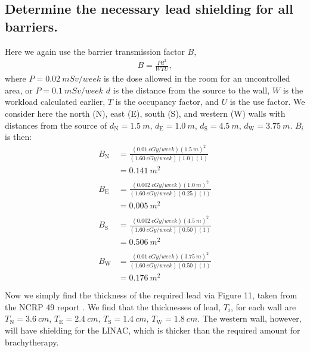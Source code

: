 \documentclass[%
aps,
mph,%
amsmath,amssymb,
preprint,%
tightenlines,
longbibliography,
superscriptaddress,
floatfix,
nofootinbib,
]{revtex4-2}
\begin{document}
    \subsection{Determine the necessary lead shielding for all barriers.}
    Here we again use the barrier transmission factor $B$,
    \begin{align}
        B = \frac{Pd^2}{WTU},
    \end{align}
    where $P = \qty{0.02}{mSv/week}$ is the dose allowed in the room for an uncontrolled area, or $P = \qty{0.1}{mSv/week}$ $d$ is the distance from the source to the wall, $W$ is the workload calculated earlier, $T$ is the occupancy factor, and $U$ is the use factor. We consider here the north (N), east (E), south (S), and western (W) walls with distances from the source of $d_\mathrm{N} = \qty{1.5}{m}$, $d_\mathrm{E} = \qty{1.0}{m}$, $d_\mathrm{S} = \qty{4.5}{m}$, $d_\mathrm{W} = \qty{3.75}{m}$. $B_i$ is then:
    \begin{align*}
        B_{\mathrm{N}} &= \frac{\left(\qty{0.01}{cGy/week}\right)\left(\qty{1.5}{m}\right)^2}{\left(\qty{1.60}{cGy/week}\right)\left(1.0\right)\left( 1 \right)}\\
        &= \qty{0.141}{m^2} \\ \\
        B_{\mathrm{E}} &= \frac{\left(\qty{0.002}{cGy/week}\right)\left(\qty{1.0}{m}\right)^2}{\left(\qty{1.60}{cGy/week}\right)\left(0.25\right)\left( 1 \right)}\\
        &= \qty{0.005}{m^2} \\ \\ 
        B_{\mathrm{S}} &= \frac{\left(\qty{0.002}{cGy/week}\right)\left(\qty{4.5}{m}\right)^2}{\left(\qty{1.60}{cGy/week}\right)\left(0.50\right)\left( 1 \right)}\\
        &= \qty{0.506}{m^2} \\ \\ 
        B_{\mathrm{W}} &= \frac{\left(\qty{0.01}{cGy/week}\right)\left(\qty{3.75}{m}\right)^2}{\left(\qty{1.60}{cGy/week}\right)\left(0.50\right)\left( 1 \right)}\\
        &= \qty{0.176}{m^2} \\ \\ 
    \end{align*}
    Now we simply find the thickness of the required lead via Figure 11, taken from the NCRP 49 report \cite{simmons1978structural}. We find that the thicknesses of lead, $T_{i}$, for each wall are $T_\mathrm{N} = \qty{3.6}{cm}$, $T_\mathrm{E} = \qty{2.4}{cm}$, $T_\mathrm{S} = \qty{1.4}{cm}$, $T_\mathrm{W} = \qty{1.8}{cm}$. The western wall, however, will have shielding for the LINAC, which is thicker than the required amount for brachytherapy. 
\end{document}
